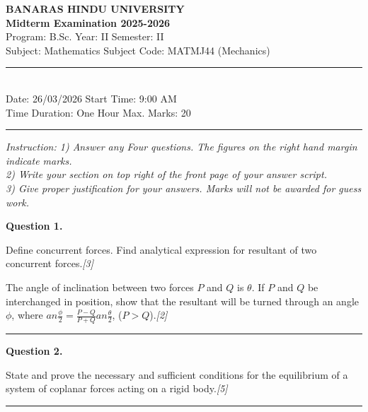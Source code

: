 \documentclass[11pt,a4paper]{article}
\newcommand{\pts}[1]{\hfill   \textit{[#1]}}
\begin{document}
\begin{center}
  {\large\bfseries BANARAS HINDU UNIVERSITY}\\[2pt]
  {\large\bfseries Midterm Examination 2025-2026}\\[4pt]
  {\normalsize Program: B.Sc. \hfill Year: II \hfill Semester: II}\\[2pt]
  {\normalsize Subject: Mathematics \hfill Subject Code: MATMJ44 (Mechanics)}\\[4pt]
  \rule{0.8\linewidth}{0.5pt}\\[6pt]
  {\normalsize Date: 26/03/2026 \hfill Start Time: 9:00 AM}\\[2pt]
  {\normalsize Time Duration: One Hour \hfill Max. Marks: 20}
\end{center}
\rule{\linewidth}{0.4pt}
\smallskip



\noindent   \textit{Instruction: 1) Answer any Four questions. The figures on the right hand margin indicate marks.\\
2) Write your section on top right of the front page of your answer script.\\
3) Give proper justification for your answers. Marks will not be awarded for guess work.}
\bigskip




\noindent   \textbf{Question 1.}

\begin{parts}
  \item Define concurrent forces. Find analytical expression for resultant of two concurrent forces.\pts{3}
  \item The angle of inclination between two forces $P$ and $Q$ is $ \theta$. If $P$ and $Q$ be interchanged in position, show that the resultant will be turned through an angle $\phi$, where $ an\frac{\phi}{2} = \frac{P-Q}{P+Q} an\frac{ \theta}{2}$, ($P > Q$).\pts{2}
\end{parts}
\medskip\rule{\linewidth}{0.2pt}

\medskip


\noindent   \textbf{Question 2.}

\begin{parts}
  \item State and prove the necessary and sufficient conditions for the equilibrium of a system of coplanar forces acting on a rigid body.\pts{5}
\end{parts}
\medskip\rule{\linewidth}{0.2pt}

\medskip
\end{document}
